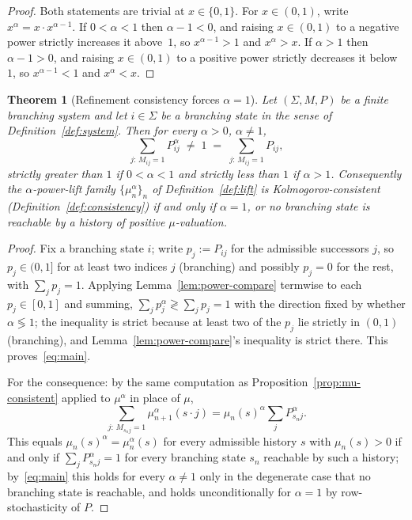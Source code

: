 \documentclass[11pt,a4paper]{article}
\newtheorem{theorem}{Theorem}[section]
\theoremstyle{definition}
\theoremstyle{remark}
\newcommand{\Sh}{\Sigma}
\begin{document}
\begin{proof}
  Both statements are trivial at $x \in \{0,1\}$. For $x \in (0,1)$, write
  $x^\alpha = x \cdot x^{\alpha-1}$. If $0<\alpha<1$ then $\alpha-1<0$, and raising
  $x\in(0,1)$ to a negative power strictly increases it above~$1$, so
  $x^{\alpha-1}>1$ and $x^\alpha>x$. If $\alpha>1$ then $\alpha-1>0$, and raising
  $x \in (0,1)$ to a positive power strictly decreases it below~$1$, so
  $x^{\alpha-1}<1$ and $x^\alpha<x$.
\end{proof}

\begin{theorem}[Refinement consistency forces $\alpha=1$]
  \label{thm:main}
  Let $(\Sh,M,P)$ be a finite branching system and let $i \in \Sh$ be a branching state
  in the sense of Definition~\ref{def:system}. Then for every $\alpha>0$, $\alpha\ne1$,
  \begin{equation}
    \label{eq:main}
    \sum_{j:\,M_{ij}=1} P_{ij}^\alpha \;\ne\; 1 \;=\; \sum_{j:\,M_{ij}=1} P_{ij},
  \end{equation}
  strictly greater than $1$ if $0<\alpha<1$ and strictly less than $1$ if $\alpha>1$.
  Consequently the $\alpha$-power-lift family $\{\mu_n^\alpha\}_n$ of
  Definition~\ref{def:lift} is Kolmogorov-consistent (Definition~\ref{def:consistency})
  if and only if $\alpha=1$, or no branching state is reachable by a history of
  positive $\mu$-valuation.
\end{theorem}

\begin{proof}
  Fix a branching state $i$; write $p_j := P_{ij}$ for the admissible successors
  $j$, so $p_j \in (0,1]$ for at least two indices $j$ (branching) and possibly
  $p_j = 0$ for the rest, with $\sum_j p_j = 1$. Applying
  Lemma~\ref{lem:power-compare} termwise to each $p_j \in [0,1]$ and summing,
  $\sum_j p_j^\alpha \gtrless \sum_j p_j = 1$ with the direction fixed by whether
  $\alpha \lessgtr 1$; the inequality is strict because at least two of the $p_j$ lie
  strictly in $(0,1)$ (branching), and Lemma~\ref{lem:power-compare}'s inequality is
  strict there. This proves~\eqref{eq:main}.

  For the consequence: by the same computation as
  Proposition~\ref{prop:mu-consistent} applied to $\mu^\alpha$ in place of $\mu$,
  \begin{equation*}
    \sum_{j:\,M_{s_n j}=1} \mu_{n+1}^\alpha(s\cdot j)
    = \mu_n(s)^\alpha \sum_{j} P_{s_n j}^\alpha .
  \end{equation*}
  This equals $\mu_n(s)^\alpha = \mu_n^\alpha(s)$ for every admissible history $s$ with
  $\mu_n(s)>0$ if and only if $\sum_j P_{s_n j}^\alpha = 1$ for every branching state
  $s_n$ reachable by such a history; by~\eqref{eq:main} this holds for every $\alpha
  \ne 1$ only in the degenerate case that no branching state is reachable, and holds
  unconditionally for $\alpha=1$ by row-stochasticity of $P$.
\end{proof}
\end{document}
